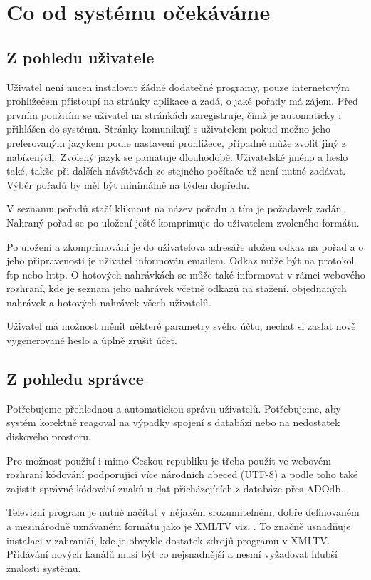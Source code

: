 \chapter{Co od systému očekáváme}

\section{Z pohledu uživatele}
Uživatel není nucen instalovat žádné dodatečné programy, pouze internetovým prohlížečem přistoupí na stránky aplikace a zadá, o jaké pořady má zájem. Před prvním použitím se uživatel na stránkách zaregistruje, čímž je automaticky i přihlášen do systému. Stránky komunikují s uživatelem pokud možno jeho preferovaným jazykem podle nastavení prohlížece, případně může zvolit jiný z nabízených. Zvolený jazyk se pamatuje dlouhodobě. Uživatelské jméno a heslo také, takže při dalších návštěvách ze stejného počítače už není nutné zadávat. Výběr pořadů by měl být minimálně na týden dopředu.

\vspace{10pt}

V seznamu pořadů stačí kliknout na název pořadu a tím je požadavek zadán. Nahraný pořad se po uložení ještě komprimuje do uživatelem zvoleného formátu.

\vspace{10pt}

Po uložení a zkomprimování je do uživatelova adresáře uložen odkaz na pořad a o jeho připravenosti je uživatel informován emailem. Odkaz může být na protokol ftp nebo http. O hotových nahrávkách se může také informovat v rámci webového rozhraní, kde je seznam jeho nahrávek včetně odkazů na stažení, objednaných nahrávek a hotových nahrávek všech uživatelů.

\vspace{10pt}

Uživatel má možnost měnit některé parametry svého účtu, nechat si zaslat nově vygenerované heslo a úplně zrušit účet.

\vspace{10pt}

\section{Z pohledu správce}
Potřebujeme přehlednou a automatickou správu uživatelů. Potřebujeme, aby systém korektně reagoval na výpadky spojení s databází nebo na nedostatek diskového prostoru.

\vspace{10pt}

Pro možnost použití i mimo Českou republiku je třeba použít ve webovém rozhraní kódování podporující více národních abeced (UTF-8) a podle toho také zajistit správné kódování znaků u dat přicházejících z databáze přes ADOdb. 

\vspace{10pt}

Televizní program je nutné načítat v nějakém srozumitelném, dobře definovaném a mezinárodně uznávaném formátu jako je XMLTV viz. \cite{xmltvURL}. To značně usnadňuje instalaci v zahraničí, kde je obvykle dostatek zdrojů programu v XMLTV. Přidávání nových kanálů musí být co nejsnadnější a nesmí vyžadovat hlubší znalosti systému.
